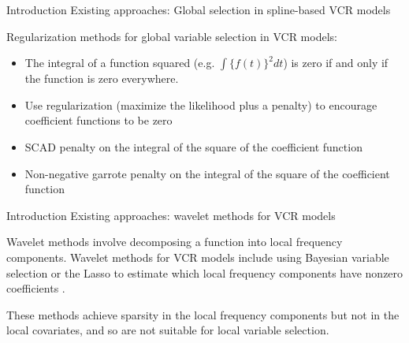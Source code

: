 \documentclass[12pt,t,handout]{beamer}
\newcommand{\subt}[1]{{\footnotesize \color{subtitle} {#1}}}
\begin{document}
\begin{frame}{Introduction}
\subt{Existing approaches: Global selection in spline-based VCR models}

\bigskip
Regularization methods for global variable selection in VCR models:
\begin{itemize}
    \item The integral of a function squared (e.g. $\int \{f(t)\}^2 dt$) is zero if and only if the function is zero everywhere.
    \item Use regularization (maximize the likelihood plus a penalty) to encourage coefficient functions to be zero
    \item SCAD penalty \citep{Fan:2001} on the integral of the square of the coefficient function \citep{Wang:2008a}
    \item Non-negative garrote penalty \citep{Breiman:1995} on the integral of the square of the coefficient function \citep{Antoniadis:2012b}
\end{itemize}

\end{frame}




\begin{frame}{Introduction}
\subt{Existing approaches: wavelet methods for VCR models}

\bigskip
Wavelet methods involve decomposing a function into local frequency components. Wavelet methods for VCR models include using Bayesian variable selection or the Lasso to estimate which local frequency components have nonzero coefficients \citep{Shang-2011,Zhang-2011}.

\vspace{10mm}

These methods achieve sparsity in the local frequency components but not in the local covariates, and so are not suitable for local variable selection.

\end{frame}
\end{document}
